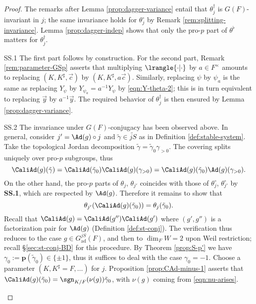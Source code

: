 \documentclass[a4paper,10pt]{article}
\begin{document}
\begin{proof}
	The remarks after Lemma \ref{prop:dagger-variance} entail that $\theta^\dagger_j$ is $G(F)$-invariant in $j$; the same invariance holds for $\theta^\circ_j$ by Remark \ref{rem:splitting-invariance}. Lemma \ref{prop:dagger-indep} shows that only the pro-$p$ part of $\theta^\flat$ matters for $\theta^\dagger_j$.
	
	\begin{asparadesc}
		\item[SS.1]\quad The first part follows by construction. For the second part, Remark \ref{rem:parameter-GSp} asserts that multiplying $\lrangle{\cdot|\cdot}$ by $a \in F^\times$ amounts to replacing $(K, K^\sharp, \vec{c})$ by $(K, K^\sharp, a\vec{c})$. Similarly, replacing $\psi$ by $\psi_a$ is the same as replacing $Y_\psi$ by $Y_{\psi_a} = a^{-1} Y_\psi$ by \eqref{eqn:Y-theta-2}; this is in turn equivalent to replacing $\vec{y}$ by $a^{-1}\vec{y}$. The required behavior of $\theta^\dagger_j$ is then ensured by Lemma \ref{prop:dagger-variance}.
		\item[SS.2]\quad The invariance under $G(F)$-conjugacy has been observed above. In general, consider $j' = \Ad(g) \circ j$ and $\tilde{\gamma} \in \widetilde{jS}$ as in Definition \ref{def:stable-system}. Take the topological Jordan decomposition $\tilde{\gamma} = \tilde{\gamma}_0 \gamma_{>0}$. The covering splits uniquely over pro-$p$ subgroups, thus
		\[ \CaliAd(g)(\tilde{\gamma}) = \CaliAd(\tilde{\gamma}_0) \CaliAd(g)(\gamma_{>0}) = \CaliAd(g)(\tilde{\gamma}_0) \Ad(g)(\gamma_{>0}). \]
		On the other hand, the pro-$p$ parts of $\theta_j$, $\theta_{j'}$ coincides with those of $\theta^\circ_j$, $\theta^\circ_{j'}$ by \textbf{SS.1}, which are respected by $\Ad(g)$. Therefore it remains to show that
		\[ \theta_{j'}(\CaliAd(g)(\tilde{\gamma}_0)) = \theta_j(\tilde{\gamma}_0). \]
		Recall that $\CaliAd(g) = \CaliAd(g'')\CaliAd(g')$ where $(g', g'')$ is a factorization pair for $\Ad(g)$ (Definition \ref{def:st-conj}). The verification thus reduces to the case $g \in G^{jS}_\text{ad}(F)$, and then to $\dim_F W = 2$ upon Weil restriction; recall \S\ref{sec:st-conj-BD} for this procedure. By Theorem \ref{prop:S-p'} we have $\gamma_0 := \bm{p}(\tilde{\gamma}_0) \in \{\pm 1\}$, thus it suffices to deal with the case $\gamma_0 = -1$. Choose a parameter $(K, K^\sharp = F, \ldots)$ for $j$. Proposition \ref{prop:CAd-minus-1} asserts that $\CaliAd(g)(\tilde{\gamma}_0) = \sgn_{K/F}(\nu(g)) \tilde{\gamma}_0$, with $\nu(g)$ coming from \eqref{eqn:nu-arises}.
		

\end{asparadesc}
\end{proof}
\end{document}
